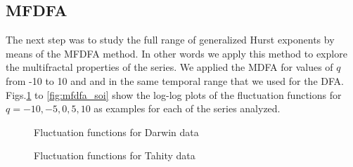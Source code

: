 \documentclass[onecolumn, preprint,aps,amsmath, amssymb, superscriptaddress]{revtex4}
\begin{document}
\subsection{MFDFA}
\label{results_mfdfa}

The next step was to study the full range of generalized Hurst exponents by means of the MFDFA method. In other words we apply this method to explore the multifractal properties of the series. We applied the MDFA for values of $q$ from -10 to 10 and and in the same temporal range that we used for the DFA. Figs.\ref{fig:mfdfa_dar} to \ref{fig:mfdfa_soi} show the log-log plots of the fluctuation functions for $q=-10,-5,0,5,10$ as examples for each of the series analyzed.

\begin{figure}
\caption{Fluctuation functions for Darwin data}
\label{fig:mfdfa_dar}
\end{figure}

\begin{figure}
\caption{Fluctuation functions for Tahity data}
\label{fig:mfdfa_tah}
\end{figure}
\end{document}
